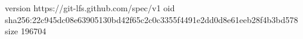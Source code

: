 version https://git-lfs.github.com/spec/v1
oid sha256:22c945dc08e63905130bd42f65c2c0c3355f4491e2dd0d8e61eeb28f4b3bd578
size 196704
